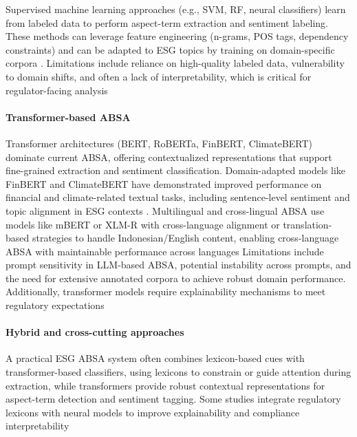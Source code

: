 Supervised machine learning approaches (e.g., SVM, RF, neural classifiers) learn from labeled data to perform aspect-term extraction and sentiment labeling. These methods can leverage feature engineering (n-grams, POS tags, dependency constraints) and can be adapted to ESG topics by training on domain-specific corpora \cite{10.1002/csr.3242,10.1371/journal.pone.0328841}.
Limitations include reliance on high-quality labeled data, vulnerability to domain shifts, and often a lack of interpretability, which is critical for regulator-facing analysis \cite{10.1371/journal.pone.0328841,10.1002/csr.3242}
\paragraph{Transformer-based ABSA}

Transformer architectures (BERT, RoBERTa, FinBERT, ClimateBERT) dominate current ABSA, offering contextualized representations that support fine-grained extraction and sentiment classification. Domain-adapted models like FinBERT and ClimateBERT have demonstrated improved performance on financial and climate-related textual tasks, including sentence-level sentiment and topic alignment in ESG contexts \cite{10.1111/1911-3846.12832,10.48550/arxiv.2510.01222,10.18653/v1/2023.emnlp-main.975,10.1108/dta-01-2024-0065}.
Multilingual and cross-lingual ABSA use models like mBERT or XLM-R with cross-language alignment or translation-based strategies to handle Indonesian/English content, enabling cross-language ABSA with maintainable performance across languages \cite{10.1016/j.inffus.2025.103073,10.1111/eufm.12509,10.48550/arxiv.2511.00024}
Limitations include prompt sensitivity in LLM-based ABSA, potential instability across prompts, and the need for extensive annotated corpora to achieve robust domain performance. Additionally, transformer models require explainability mechanisms to meet regulatory expectations \cite{10.1002/csr.70089,10.2139/ssrn.3738629}
\paragraph{Hybrid and cross-cutting approaches}

A practical ESG ABSA system often combines lexicon-based cues with transformer-based classifiers, using lexicons to constrain or guide attention during extraction, while transformers provide robust contextual representations for aspect-term detection and sentiment tagging. Some studies integrate regulatory lexicons with neural models to improve explainability and compliance interpretability \cite{10.1002/csr.70089,10.2139/ssrn.3738629,10.1108/mf-01-2023-0020,10.1111/eufm.12509}

